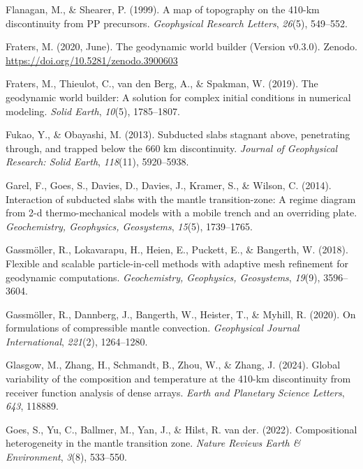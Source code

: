 \documentclass[draft,linenumbers]{agujournal2019}
\newlength{\cslhangindent}
\newenvironment{CSLReferences}[2]
 {\begin{list}{}{
  \setlength{\itemindent}{0pt}
  \setlength{\leftmargin}{0pt}
  \setlength{\parsep}{0pt}
  \ifodd #1
   \setlength{\leftmargin}{\cslhangindent}
   \setlength{\itemindent}{-\cslhangindent}
  \fi
  \setlength{\itemsep}{#2\baselineskip}
  }
  \item\relax}
 {\end{list}}
\begin{document}
\begin{CSLReferences}{1}{0}
Flanagan, M., \& Shearer, P. (1999). A map of topography on the 410-km
discontinuity from PP precursors. \emph{Geophysical Research Letters},
\emph{26}(5), 549--552.

Fraters, M. (2020, June). The geodynamic world builder (Version v0.3.0).
Zenodo. \url{https://doi.org/10.5281/zenodo.3900603}

{Fraters, M., Thieulot, C., van den Berg, A., \& Spakman, W.} (2019).
The geodynamic world builder: A solution for complex initial conditions
in numerical modeling. \emph{Solid Earth}, \emph{10}(5), 1785--1807.

Fukao, Y., \& Obayashi, M. (2013). Subducted slabs stagnant above,
penetrating through, and trapped below the 660 km discontinuity.
\emph{Journal of Geophysical Research: Solid Earth}, \emph{118}(11),
5920--5938.

Garel, F., Goes, S., Davies, D., Davies, J., Kramer, S., \& Wilson, C.
(2014). Interaction of subducted slabs with the mantle transition-zone:
A regime diagram from 2-d thermo-mechanical models with a mobile trench
and an overriding plate. \emph{Geochemistry, Geophysics, Geosystems},
\emph{15}(5), 1739--1765.

Gassmöller, R., Lokavarapu, H., Heien, E., Puckett, E., \& Bangerth, W.
(2018). Flexible and scalable particle-in-cell methods with adaptive
mesh refinement for geodynamic computations. \emph{Geochemistry,
Geophysics, Geosystems}, \emph{19}(9), 3596--3604.

Gassmöller, R., Dannberg, J., Bangerth, W., Heister, T., \& Myhill, R.
(2020). On formulations of compressible mantle convection.
\emph{Geophysical Journal International}, \emph{221}(2), 1264--1280.

Glasgow, M., Zhang, H., Schmandt, B., Zhou, W., \& Zhang, J. (2024).
Global variability of the composition and temperature at the 410-km
discontinuity from receiver function analysis of dense arrays.
\emph{Earth and Planetary Science Letters}, \emph{643}, 118889.

Goes, S., Yu, C., Ballmer, M., Yan, J., \& Hilst, R. van der. (2022).
Compositional heterogeneity in the mantle transition zone. \emph{Nature
Reviews Earth \& Environment}, \emph{3}(8), 533--550.


\end{CSLReferences}
\end{document}
